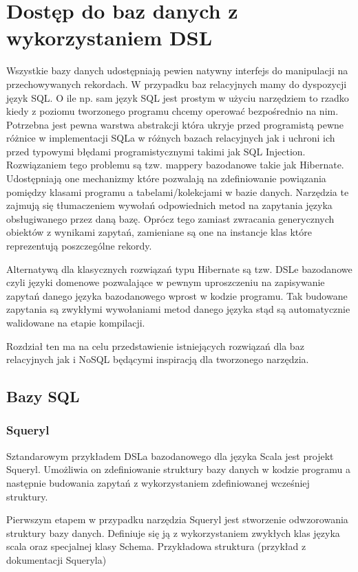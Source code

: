 \documentclass[brudnopis]{xmgr}
\begin{document}
\chapter{Dostęp do baz danych z wykorzystaniem DSL}

Wszystkie bazy danych udostępniają pewien natywny interfejs do manipulacji na przechowywanych rekordach. W przypadku baz relacyjnych mamy do dyspozycji język SQL. O ile np. sam język SQL jest prostym w użyciu narzędziem to rzadko kiedy z poziomu tworzonego programu chcemy operować bezpośrednio na nim. Potrzebna jest pewna warstwa abstrakcji która ukryje przed programistą pewne różnice w implementacji SQLa w różnych bazach relacyjnych jak i uchroni ich przed typowymi błędami programistycznymi takimi jak SQL Injection. Rozwiązaniem tego problemu są tzw. mappery bazodanowe takie jak Hibernate. Udostępniają one mechanizmy które pozwalają na zdefiniowanie powiązania pomiędzy klasami programu a tabelami/kolekcjami w bazie danych. Narzędzia te zajmują się tłumaczeniem wywołań odpowiednich metod na zapytania języka obsługiwanego przez daną bazę. Oprócz tego zamiast zwracania generycznych obiektów z wynikami zapytań, zamieniane są one na instancje klas które reprezentują poszczególne rekordy.

Alternatywą dla klasycznych rozwiązań typu Hibernate są tzw. DSLe bazodanowe czyli języki domenowe pozwalające w pewnym uproszczeniu na zapisywanie zapytań danego języka bazodanowego wprost w kodzie programu. Tak budowane zapytania są zwykłymi wywołaniami metod danego języka stąd są automatycznie walidowane na etapie kompilacji.

Rozdział ten ma na celu przedstawienie istniejących rozwiązań dla baz relacyjnych jak i NoSQL będącymi inspiracją dla tworzonego narzędzia.

\section{Bazy SQL}

\subsection{Squeryl}

Sztandarowym przykładem DSLa bazodanowego dla języka Scala jest projekt Squeryl. Umożliwia on zdefiniowanie struktury bazy danych w kodzie programu a następnie budowania zapytań z wykorzystaniem zdefiniowanej wcześniej struktury.

Pierwszym etapem w przypadku narzędzia Squeryl jest stworzenie odwzorowania struktury bazy danych. Definiuje się ją z wykorzystaniem zwykłych klas języka scala oraz specjalnej klasy Schema. Przykładowa struktura (przykład z dokumentacji Squeryla)
\end{document}
